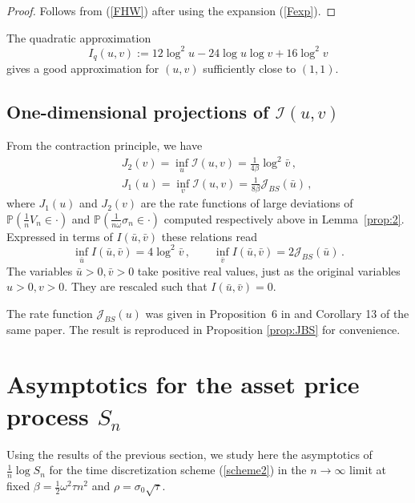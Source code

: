 \documentclass[11pt]{article}
\numberwithin{equation}{section}
\theoremstyle{plain}
\begin{document}
\begin{proof}
Follows from (\ref{FHW}) after using the expansion (\ref{Fexp}).
\end{proof}

The quadratic approximation 
\begin{equation}\label{Iquad}
I_q(u,v) := 12\log^2 u -24 \log u \log v+ 16 \log^2 v 
\end{equation}
gives a good approximation for $(u,v)$ sufficiently close to $(1,1)$. 

\subsection{One-dimensional projections of $\mathcal{I}(u,v)$}

From the contraction principle, we have
\begin{eqnarray}\label{Iconstu}
&& J_2(v)=\inf_{u} \mathcal{I}(u,v) 
   = \frac{1}{4\beta} \log^2 \bar v\,, \\
&& J_1(u)=\inf_{v} \mathcal{I}(u,v)  
   = \frac{1}{8\beta} \mathcal{J}_{BS}(\bar u)\,, \label{Iconstv}
\end{eqnarray}
where $J_1(u)$ and $J_2(v)$ are the rate functions of
large deviations of 
$\mathbb{P}(\frac{1}{n} V_n \in \cdot)$ and $\mathbb{P}(\frac{1}{n\omega} \sigma_n \in \cdot)$ 
computed respectively above in Lemma~\ref{prop:2}. 
Expressed in terms of $I(\bar u,\bar v)$ these relations read
\begin{equation}
\inf_{\bar u} I(\bar u,\bar v) = 4 \log^2 \bar v\,,
\qquad
\inf_{\bar v} I(\bar u,\bar v) = 2 \mathcal{J}_{BS}(\bar u)\,.
\end{equation}
The variables $\bar u>0,\bar v >0$ take positive real values,
just as the original variables $u>0, v>0$. They are rescaled such that
$I(\bar u, \bar v)=0$.

The rate function $\mathcal{J}_{BS}(u)$ was given in Proposition~6 in 
\cite{PZDiscreteAsian}
and Corollary 13 of the same paper. The result is reproduced in Proposition
\ref{prop:JBS} for convenience.



\section{Asymptotics for the asset price process $S_n$}
\label{sec:4}

Using the results of the previous section, we study here the asymptotics of 
$\frac{1}{n}\log S_n$ for the time discretization scheme (\ref{scheme2})
in the $n\to \infty$ limit at fixed $\beta = \frac12 \omega^2 \tau n^2$ and 
$\rho = \sigma_0 \sqrt{\tau}$.
\end{document}
